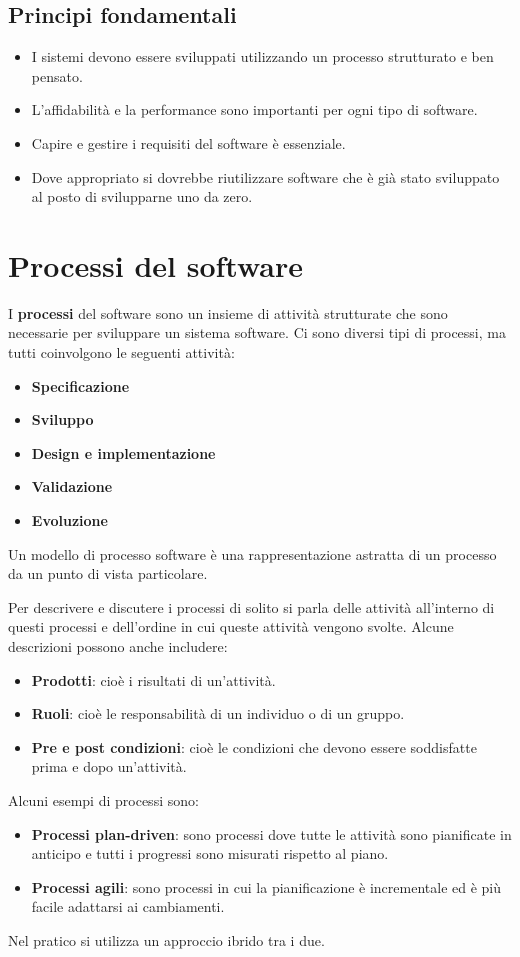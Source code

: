 \documentclass[a4paper]{article}
\begin{document}
\subsection{Principi fondamentali}
\begin{itemize}
  \item I sistemi devono essere sviluppati utilizzando un processo strutturato e ben
    pensato.
  \item L'affidabilità e la performance sono importanti per ogni tipo di software.
  \item Capire e gestire i requisiti del software è essenziale.
  \item Dove appropriato si dovrebbe riutilizzare software che è già stato sviluppato
    al posto di svilupparne uno da zero.
\end{itemize}

\section{Processi del software}
I \textbf{processi} del software sono un insieme di attività strutturate che sono necessarie
per sviluppare un sistema software. Ci sono diversi tipi di processi, ma tutti coinvolgono
le seguenti attività:
\begin{itemize}
  \item \textbf{Specificazione}
  \item \textbf{Sviluppo}
  \item \textbf{Design e implementazione}
  \item \textbf{Validazione}
  \item \textbf{Evoluzione}
\end{itemize}
Un modello di processo software è una rappresentazione astratta di un processo da un punto
di vista particolare.

Per descrivere e discutere i processi di solito si parla delle attività all'interno di
questi processi e dell'ordine in cui queste attività vengono svolte. Alcune descrizioni
possono anche includere:
\begin{itemize}
  \item \textbf{Prodotti}: cioè i risultati di un'attività.
  \item \textbf{Ruoli}: cioè le responsabilità di un individuo o di un gruppo.
  \item \textbf{Pre e post condizioni}: cioè le condizioni che devono essere soddisfatte
    prima e dopo un'attività.
\end{itemize}
Alcuni esempi di processi sono:
\begin{itemize}
  \item \textbf{Processi plan-driven}: sono processi dove tutte le attività sono pianificate
    in anticipo e tutti i progressi sono misurati rispetto al piano.
  \item \textbf{Processi agili}: sono processi in cui la pianificazione è incrementale ed
    è più facile adattarsi ai cambiamenti.
\end{itemize}
Nel pratico si utilizza un approccio ibrido tra i due.
\end{document}
